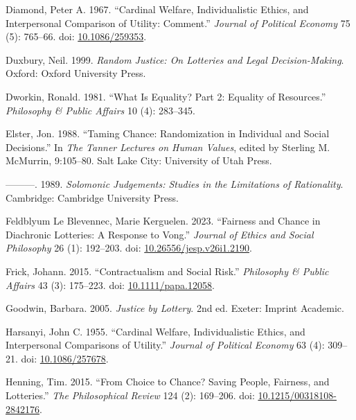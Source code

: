 \documentclass[
  11pt,
  letterpaper,
  DIV=11,
  numbers=noendperiod,
  twoside]{scrartcl}
\newlength{\cslhangindent}
\newenvironment{CSLReferences}[2] %
 {\begin{list}{}{%
  \setlength{\itemindent}{0pt}
  \setlength{\leftmargin}{0pt}
  \setlength{\parsep}{0pt}
  \ifodd #1
   \setlength{\leftmargin}{\cslhangindent}
   \setlength{\itemindent}{-1\cslhangindent}
  \fi
  \setlength{\itemsep}{#2\baselineskip}}}
 {\end{list}}
\begin{document}
\begin{CSLReferences}{1}{0}
Diamond, Peter A. 1967. {``Cardinal Welfare, Individualistic Ethics, and
Interpersonal Comparison of Utility: Comment.''} \emph{Journal of
Political Economy} 75 (5): 765--66. doi:
\href{https://doi.org/10.1086/259353}{10.1086/259353}.

Duxbury, Neil. 1999. \emph{Random Justice: On Lotteries and Legal
Decision-Making}. Oxford: Oxford University Press.

Dworkin, Ronald. 1981. {``What Is Equality? Part 2: Equality of
Resources.''} \emph{Philosophy \& Public Affairs} 10 (4): 283--345.

Elster, Jon. 1988. {``Taming Chance: Randomization in Individual and
Social Decisions.''} In \emph{The Tanner Lectures on Human Values},
edited by Sterling M. McMurrin, 9:105--80. Salt Lake City: University of
Utah Press.

---------. 1989. \emph{Solomonic Judgements: Studies in the Limitations
of Rationality}. Cambridge: Cambridge University Press.

Feldblyum Le Blevennec, Marie Kerguelen. 2023. {``Fairness and Chance in
Diachronic Lotteries: A Response to Vong.''} \emph{Journal of Ethics and
Social Philosophy} 26 (1): 192--203. doi:
\href{https://doi.org/10.26556/jesp.v26i1.2190}{10.26556/jesp.v26i1.2190}.

Frick, Johann. 2015. {``Contractualism and Social Risk.''}
\emph{Philosophy \& Public Affairs} 43 (3): 175--223. doi:
\href{https://doi.org/10.1111/papa.12058}{10.1111/papa.12058}.

Goodwin, Barbara. 2005. \emph{Justice by Lottery}. 2nd ed. Exeter:
Imprint Academic.

Harsanyi, John C. 1955. {``Cardinal Welfare, Individualistic Ethics, and
Interpersonal Comparisons of Utility.''} \emph{Journal of Political
Economy} 63 (4): 309--21. doi:
\href{https://doi.org/10.1086/257678}{10.1086/257678}.

Henning, Tim. 2015. {``From Choice to Chance? Saving People, Fairness,
and Lotteries.''} \emph{The Philosophical Review} 124 (2): 169--206.
doi:
\href{https://doi.org/10.1215/00318108-2842176}{10.1215/00318108-2842176}.


\end{CSLReferences}
\end{document}
